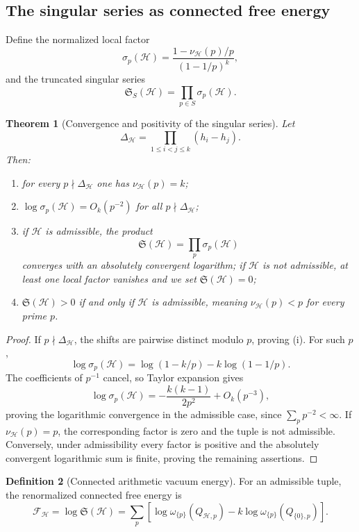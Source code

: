 \documentclass[11pt]{article}
\newtheorem{theorem}{Theorem}[section]
\theoremstyle{definition}
\newtheorem{definition}[theorem]{Definition}
\theoremstyle{remark}
\newcommand{\1}{\mathbf 1}
\newcommand{\cH}{\mathcal H}
\newcommand{\cS}{\mathfrak S}
\begin{document}
\subsection{The singular series as connected free energy}

Define the normalized local factor
\[
\sigma_p(\cH)
=
\frac{1-\nu_{\cH}(p)/p}{(1-1/p)^k},
\]
and the truncated singular series
\[
\cS_S(\cH)=\prod_{p\in S}\sigma_p(\cH).
\]

\begin{theorem}[Convergence and positivity of the singular series]
Let
\[
\Delta_{\cH}=\prod_{1\leq i<j\leq k}(h_i-h_j).
\]
Then:
\begin{enumerate}[label=(\roman*)]
\item for every $p\nmid\Delta_{\cH}$ one has $\nu_{\cH}(p)=k$;
\item $\log\sigma_p(\cH)=O_k(p^{-2})$ for all $p\nmid\Delta_{\cH}$;
\item if $\cH$ is admissible, the product
\[
\cS(\cH)=\prod_p\sigma_p(\cH)
\]
converges with an absolutely convergent logarithm; if $\cH$ is not admissible, at least one local factor vanishes and we set $\cS(\cH)=0$;
\item $\cS(\cH)>0$ if and only if $\cH$ is admissible, meaning $\nu_{\cH}(p)<p$ for every prime $p$.
\end{enumerate}
\end{theorem}

\begin{proof}
If $p\nmid\Delta_{\cH}$, the shifts are pairwise distinct modulo $p$, proving (i).  For such $p$,
\[
\log\sigma_p(\cH)
=
\log(1-k/p)-k\log(1-1/p).
\]
The coefficients of $p^{-1}$ cancel, so Taylor expansion gives
\[
\log\sigma_p(\cH)
=-\frac{k(k-1)}{2p^2}+O_k(p^{-3}),
\]
proving the logarithmic convergence in the admissible case, since $\sum_pp^{-2}<\infty$.  If $\nu_{\cH}(p)=p$, the corresponding factor is zero and the tuple is not admissible.  Conversely, under admissibility every factor is positive and the absolutely convergent logarithmic sum is finite, proving the remaining assertions.
\end{proof}

\begin{definition}[Connected arithmetic vacuum energy]
For an admissible tuple, the renormalized connected free energy is
\[
\mathcal F_{\cH}
=
\log\cS(\cH)
=
\sum_p\left[
\log\omega_{\{p\}}(Q_{\cH,p})
-k\log\omega_{\{p\}}(Q_{\{0\},p})
\right].
\]
\end{definition}
\end{document}
